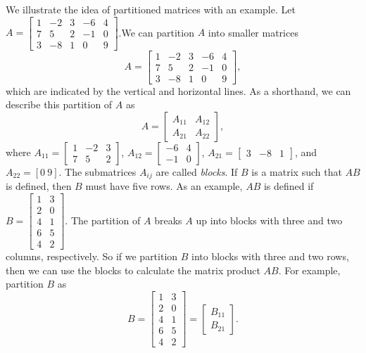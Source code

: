 \begin{pactivity} We illustrate the idea of partitioned matrices with an example. Let $A = \left[ \begin{array}{crcrc} 1&-2&3&-6&4 \\ 7&5&2&-1&0 \\ 3&-8&1&0&9 \end{array} \right]$.We can partition $A$ into smaller matrices 
\[A = \left[ \begin{array}{crc|rc} 1&-2&3&-6&4 \\ 7&5&2&-1&0  \\ \hline 3&-8&1&0&9 \end{array} \right],\]
which are indicated by the vertical and horizontal lines. As a shorthand, we can describe this partition of $A$ as
\[A = \left[ \begin{array}{cc} A_{11}&A_{12} \\ A_{21}&A_{22} \end{array} \right],\]
where $A_{11} = \left[ \begin{array}{crc} 1&-2&3\\ 7&5&2   \end{array} \right]$, $A_{12} = \left[ \begin{array}{rc} -6&4 \\ -1&0  \end{array} \right]$, $A_{21} = \left[ \begin{array}{crc} 3&-8&1\end{array} \right]$, and $A_{22} =  [0 \ 9 ]$. The submatrices $A_{ij}$ are called \emph{blocks}. If $B$  is a matrix such that $AB$ is defined, then $B$ must have five rows. As an example, $AB$ is defined if $B = \left[ \begin{array}{cc} 1&3\\2&0 \\ 4&1\\6&5\\4&2 \end{array} \right]$. The partition of $A$ breaks $A$ up into blocks with three and two columns, respectively. So if we partition $B$ into blocks with three and two rows, then we can use the blocks to calculate the matrix product $AB$. For example, partition $B$ as 
\[B = \left[ \begin{array}{cc} 1&3\\2&0 \\ 4&1\\ \hline 6&5\\4&2 \end{array} \right] = \left[ \begin{array}{c} B_{11}\\B_{21} \end{array} \right].\]

\end{pactivity}
